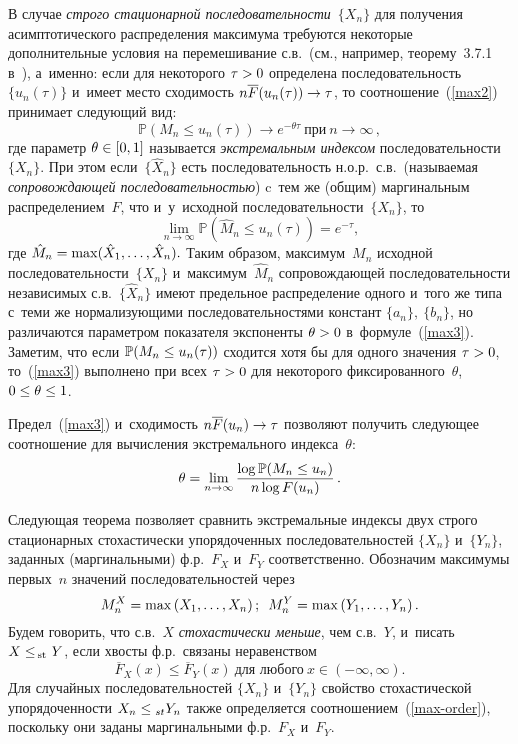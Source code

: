 \begin{multicols}{2}
В случае \textit{строго стационарной по\-сле\-до\-ва\-тель\-ности}~$\{X_n\}$   для получения 
асимптотического распределения  максимума 
требуются некоторые дополнительные условия на перемешивание с.в.\  (см., 
например,   тео\-ре\-му~3.7.1 в~\cite{Leadbetter}), а~именно: если для некоторого 
$\tau\hm>0$ определена последовательность $\{ u_n (\tau) \}$ и~имеет место 
сходимость  $n\overline F(u_n(\tau))\hm\to \tau$, то соотношение~(\ref{max2}) 
принимает сле\-ду\-ющий вид:
\begin{equation}
\label{max3}
\mathbb{P} \left(M_n \le u_n (\tau)\right) \to e^{-\theta \tau} \ \mbox{при} \ n\to \infty\,,
\end{equation}
где параметр  $\theta \hm\in [0, 1]$ называется \textit{экстремальным индексом} 
последовательности~$\{ X_n \}.$
При этом если~$\{ \hat X_n \}$
есть последовательность н.о.р.\ с.в.\  (называемая \textit{сопровождающей 
последовательностью}) c~тем же (общим) маргинальным   распределением~$F$, что   
и~у~исходной последовательности~$\{ X_n \}$,
то
$$
\lim\limits_{n\to \infty}\mathbb{P} \left(\hat M_n \le u_n (\tau) \right)= e^{-\tau},
$$
где $\hat M_n\hm=\max(\hat X_1,\dots , \hat X_n).$
 Таким образом, максимум~$M_n$ исходной последовательности~$\{ X_n \}$  
 и~максимум~$\hat M _n$ сопровождающей последовательности независимых 
 с.в.~$\{ \hat X_n \}$ имеют предельное распределение одного и~того же типа с~теми же 
нор\-ма\-ли\-зу\-ющи\-ми последовательностями констант $\{a_n\} ,\ \{b_n\}$, но 
различаются па\-ра\-мет\-ром показателя
 экспоненты $\theta\hm > 0$ в~формуле~(\ref{max3}).
Заметим, что если $\mathbb{P} (M_n\hm\le u_n(\tau))$ сходится хотя бы для одного значения 
$\tau \hm> 0$, то~(\ref{max3}) выполнено при всех $\tau \hm> 0$ для некоторого 
фиксированного~$\theta$, $0\hm\le \theta \hm\le 1$.

Предел~(\ref{max3}) и~сходимость  $n\overline F(u_n) \hm\to \tau$ позволяют 
получить следующее  соотношение для вычисления экстремального индекса~$\theta$:
\begin{equation}
\label{theta-1}
    \theta=\lim\limits_{n\to\infty} \displaystyle\frac{\displaystyle \log \mathbb{P} (M_n\le u_n)\mathstrut}{\displaystyle n \log F(u_n)\mathstrut}\,.
\end{equation}

Следующая теорема позволяет сравнить экстремальные индексы двух строго 
стационарных стохастически упорядоченных последовательностей $\{ X_n \}$ 
и~$\{ Y_n \}$, заданных  (маргинальными) ф.р.~$F_X$ и~$F_Y$ соответственно.  
Обозначим максимумы первых~$n$ значений последовательностей через
$$
M_n^X=\max\left(X_1,\ldots, X_n\right);\enskip M_n^Y=\max\left(Y_1,\dots, Y_n\right).
$$
Будем говорить, что с.в.~$X$ \textit{стохастически меньше}, чем  с.в.~$Y$, 
и~писать  $X \hm\le_{\!\mathrm{st}}\ Y$,
если хвосты  ф.р.\ связаны неравенством~\cite{Ross}
\begin{equation}
\label{max-order}
    \overline F_X(x) \le \overline F_Y(x) \ \mbox{для любого} \ x \in (-\infty, 
\infty).
\end{equation}
Для случайных последовательностей $\{ X_n \}$ и~$\{ Y_n \}$ свойство 
стохастической упорядоченности $X_n\hm\le_{st} Y_n$  также определяется  
соотношением~(\ref{max-order}), поскольку они заданы маргинальными  ф.р.~$F_X$ 
и~$F_Y$.


\end{multicols}
